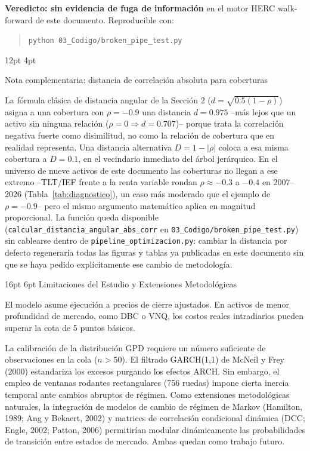 \documentclass[11pt,a4paper]{article}
\makeatletter
\renewcommand\section{\@startsection{section}{1}{\z@}%
  {16pt \@plus 3pt \@minus 2pt}%
  {6pt}%
  {\centering\large\bfseries\color{navyblue}}}
\renewcommand\subsection{\@startsection{subsection}{2}{\z@}%
  {12pt \@plus 2pt \@minus 1pt}%
  {4pt}%
  {\raggedright\normalsize\bfseries\color{navyblue}}}
\makeatother
\begin{document}
\textbf{Veredicto: sin evidencia de fuga de información} en el motor HERC walk-forward de
este documento. Reproducible con:
\begin{quote}
\texttt{python 03\_Codigo/broken\_pipe\_test.py}
\end{quote}

\subsection{Nota complementaria: distancia de correlación absoluta para coberturas}

La fórmula clásica de distancia angular de la Sección 2 ($d = \sqrt{0.5(1-\rho)}$) asigna a
una cobertura con $\rho=-0.9$ una distancia $d=0.975$ --más lejos que un activo sin ninguna
relación ($\rho=0 \Rightarrow d=0.707$)-- porque trata la correlación negativa fuerte como
disimilitud, no como la relación de cobertura que en realidad representa. Una distancia
alternativa $D = 1-|\rho|$ coloca a esa misma cobertura a $D=0.1$, en el vecindario
inmediato del árbol jerárquico. En el universo de nueve activos de este documento las
coberturas no llegan a ese extremo --TLT/IEF frente a la renta variable rondan
$\rho \approx -0.3$ a $-0.4$ en 2007--2026 (Tabla~\ref{tab:diagnostico}), un caso más
moderado que el ejemplo de $\rho=-0.9$-- pero el mismo argumento matemático aplica en
magnitud proporcional. La función queda disponible (\texttt{calcular\_distancia\_angular\_abs\_corr}
en \texttt{03\_Codigo/broken\_pipe\_test.py}) sin cablearse dentro de
\texttt{pipeline\_optimizacion.py}: cambiar la distancia por defecto regeneraría todas las
figuras y tablas ya publicadas en este documento sin que se haya pedido explícitamente ese
cambio de metodología.

\section{Limitaciones del Estudio y Extensiones Metodológicas}

El modelo asume ejecución a precios de cierre ajustados. En activos de menor profundidad de mercado, como DBC o VNQ, los costos reales intradiarios pueden superar la cota de 5 puntos básicos.

La calibración de la distribución GPD requiere un número suficiente de observaciones en la cola ($n > 50$). El filtrado GARCH(1,1) de McNeil y Frey (2000) estandariza los excesos purgando los efectos ARCH. Sin embargo, el empleo de ventanas rodantes rectangulares (756 ruedas) impone cierta inercia temporal ante cambios abruptos de régimen. Como extensiones metodológicas naturales, la integración de modelos de cambio de régimen de Markov (Hamilton, 1989; Ang y Bekaert, 2002) y matrices de correlación condicional dinámica (DCC; Engle, 2002; Patton, 2006) permitirían modular dinámicamente las probabilidades de transición entre estados de mercado. Ambas quedan como trabajo futuro.
\end{document}
